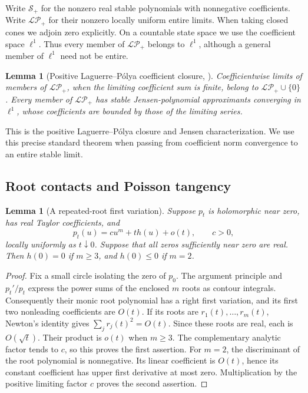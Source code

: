 \documentclass[reqno]{amsart}
\newtheorem{lemma}[theorem]{Lemma}
\theoremstyle{definition}
\theoremstyle{remark}
\begin{document}
Write \(\mathcal S_+\) for the nonzero real stable polynomials with nonnegative
coefficients.  Write \(\mathcal{LP}_+\) for their nonzero locally uniform entire limits.
When taking closed cones we adjoin zero explicitly.  On a countable state space we use
the coefficient space \(\ell^1\).  Thus every member of \(\mathcal{LP}_+\) belongs to
\(\ell^1\), although a general member of \(\ell^1\) need not be entire.
\begin{lemma}[Positive Laguerre--P\'olya coefficient closure, \cite{LVR10}]\label{pos:lp-closure}
Coefficientwise limits of members of \(\mathcal{LP}_+\), when the limiting
coefficient sum is finite, belong to \(\mathcal{LP}_+\cup\{0\}\).
Every member of \(\mathcal{LP}_+\) has stable Jensen-polynomial approximants
converging in \(\ell^1\), whose coefficients are bounded by those of the
limiting series.
\end{lemma}
This is the positive Laguerre--P\'olya closure and Jensen characterization.
We use this precise standard theorem when passing from coefficient norm convergence
to an entire stable limit.

\subsection{Root contacts and Poisson tangency}

\begin{lemma}[A repeated-root first variation]\label{pos:root-contact}
Suppose \(p_t\) is holomorphic near zero, has real Taylor coefficients, and
\[
p_t(u)=c u^m+t h(u)+o(t),\qquad c>0,
\]
locally uniformly as \(t\downarrow0\).  Suppose that all zeros sufficiently near zero
are real.  Then \(h(0)=0\) if \(m\ge3\), and \(h(0)\le0\) if \(m=2\).
\end{lemma}
\begin{proof}
Fix a small circle isolating the zero of \(p_0\).  The argument principle and
\(p_t'/p_t\) express the power sums of the enclosed \(m\) roots as contour integrals.
Consequently their monic root polynomial has a right first variation, and its first
two nonleading coefficients are \(O(t)\).  If its roots are \(r_1(t),\ldots,r_m(t)\),
Newton's identity gives \(\sum_jr_j(t)^2=O(t)\).  Since these roots are real, each is
\(O(\sqrt t)\).  Their product is \(o(t)\) when \(m\ge3\).  The complementary analytic
factor tends to \(c\), so this proves the first assertion.  For \(m=2\), the
discriminant of the root polynomial is nonnegative.  Its linear coefficient is
\(O(t)\), hence its constant coefficient has upper first derivative at most zero.
Multiplication by the positive limiting factor \(c\) proves the second assertion.
\end{proof}
\end{document}
